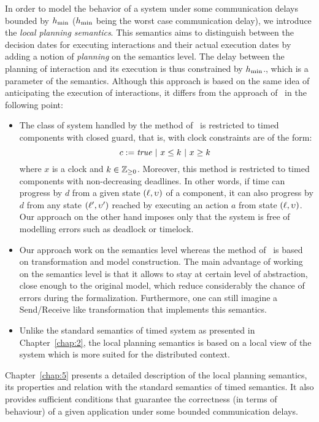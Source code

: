 In order to model the behavior of a system under some communication delays bounded by $h_{\min}$
($h_{\min}$ being the worst case communication delay), we introduce the \emph{local planning 
semantics}. This semantics aims to distinguish between the decision dates for executing 
interactions and their actual execution dates by adding a notion of \emph{planning} on 
the semantics level. The delay between the planning of interaction and its execution is
thus constrained by $h_{\min}$., which is a parameter of the semantics. Although this approach 
is based on the same idea of anticipating the execution of interactions, it differs from 
the approach of~\cite{} in the following point:
\begin{itemize}
  \item The class of system handled by the method of~\cite{} is restricted to timed components
    with closed guard, that is, with clock constraints are of the form:
    \begin{displaymath}
    c:=\textnormal{\textit{true}} \ | \ x\le k \ |\ x\ge k \
    \end{displaymath}
    where $x$ is a clock and $k\in\mathbb{Z}_{\ge 0}$.
    Moreover, this method is restricted to timed components with non-decreasing deadlines. In
    other words, if time can progress by $d$ from a given state $(\ell,\upsilon)$ of a component, 
    it can also progress by $d$ from any state $(\ell',\upsilon')$ reached by executing an action
    $a$ from state $(\ell,\upsilon)$. Our approach on the other hand imposes only that 
    the system is free of modelling errors such as deadlock or timelock. 
  \item Our approach work on the semantics level whereas the method of~\cite{} is based on 
    transformation and model construction. The main advantage of working on the semantics
    level is that it allows to stay at certain level of abstraction, close enough to the 
    original model, which reduce considerably the chance of errors during the formalization.
    Furthermore, one can still imagine a Send/Receive like transformation that implements
    this semantics.
  \item Unlike the standard semantics of timed system as presented in Chapter~\ref{chap:2}, 
    the local planning semantics is based on a local view of the system which is more suited
    for the distributed context.  
\end{itemize}
Chapter~\ref{chap:5} presents a detailed description of the local planning semantics, its 
properties and relation with the standard semantics of timed semantics. It also provides
sufficient conditions that guarantee the correctness (in terms of behaviour) of a given
application under some bounded communication delays.

